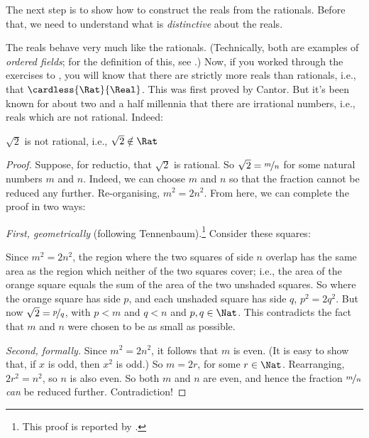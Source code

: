 \documentclass[../../../include/open-logic-section]{subfiles}
\begin{document}

The next step is to show how to construct the reals from the
rationals. Before that, we need to understand what is
\emph{distinctive} about the reals. 

The reals behave very much like the rationals. (Technically, both are
examples of \emph{ordered fields}; for the definition of this, see
.) Now, if you worked through the exercises
to , you will know that there are strictly
more reals than rationals, i.e., that $\cardless{\Rat}{\Real}$. This
was first proved by Cantor. But it's been known for about two and a
half millennia that there are irrational numbers, i.e., reals which
are not rational. Indeed:
\begin{thm}
$\sqrt{2}$ is not rational, i.e., $\sqrt{2} \notin \Rat$
\end{thm}

\begin{proof}
Suppose, for reductio, that $\sqrt{2}$ is rational. So $\sqrt{2} =
\nicefrac{m}{n}$ for some natural numbers $m$ and $n$. Indeed, we can
choose $m$ and $n$ so that the fraction cannot be reduced any further.
Re-organising, $m^{2} = 2n^{2}$. From here, we can complete the proof
in two ways:

\emph{First, geometrically} (following Tennenbaum).\footnote{This
proof is reported by \cite{Conway2006}.} Consider these squares:
\begin{center}	
\end{center}
Since $m^2 = 2n^2$, the region where the two squares of side $n$
overlap has the same area as the region which neither of the two
squares cover; i.e., the area of the orange square equals the sum of
the area of the two unshaded squares. So where the orange square has
side $p$, and each unshaded square has side $q$, $p^2 = 2q^2$. But now
$\sqrt{2} = \nicefrac{p}{q}$, with $p < m$ and $q < n$ and $p, q \in
\Nat$. This contradicts the fact that $m$ and $n$ were chosen to be as
small as possible.
		
\emph{Second, formally.} Since $m^{2} = 2n^{2}$, it follows that $m$
is even. (It is easy to show that, if $x$ is odd, then $x^2$ is odd.)
So $m = 2r$, for some $r \in \Nat$. Rearranging, $2r^2 = n^2$, 
so $n$ is also even. So both $m$ and $n$ are even, and hence the
fraction $\nicefrac{m}{n}$ \emph{can} be reduced further.
Contradiction!
\end{proof}
\end{document}
